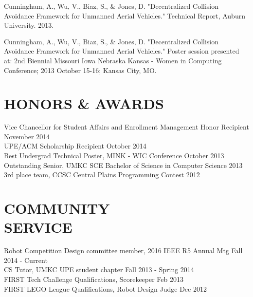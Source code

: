 \documentclass[line,margin]{res}
\begin{document}
\begin{resume}
\hangindent=0.7cm Cunningham, A., Wu, V., Biaz, S., \& Jones, D. "Decentralized Collision Avoidance Framework for Unmanned Aerial Vehicles." Technical Report, Auburn University. 2013.

\hangindent=0.7cm Cunningham, A., Wu, V., Biaz, S., \& Jones, D. "Decentralized Collision Avoidance Framework for Unmanned Aerial Vehicles." Poster session presented at: 2nd Biennial Missouri Iowa Nebraska Kansas - Women in Computing Conference; 2013 October 15-16; Kansas City, MO.
		

\section{HONORS \& AWARDS}
		Vice Chancellor for Student Affairs and Enrollment Management Honor Recipient \hfill November 2014\\
		UPE/ACM Scholarship Recipient \hfill October 2014 \\
		Best Undergrad Technical Poster, MINK - WIC Conference \hfill October 2013	\\
		Outstanding Senior, UMKC SCE Bachelor of Science in Computer Science \hfill 2013 \\
		3rd place team, CCSC Central Plains Programming Contest \hfill 2012 
\section{COMMUNITY \\ SERVICE}  
		Robot Competition Design committee member, 2016 IEEE R5 Annual Mtg \hfill Fall 2014 - Current \\  
            	CS Tutor, UMKC UPE student chapter  \hfill Fall 2013 - Spring 2014 \\
                FIRST Tech Challenge Qualifications, Scorekeeper \hfill Feb 2013 \\
		FIRST LEGO League Qualifications, Robot Design Judge \hfill Dec 2012  \\

\end{resume}
\end{document}
